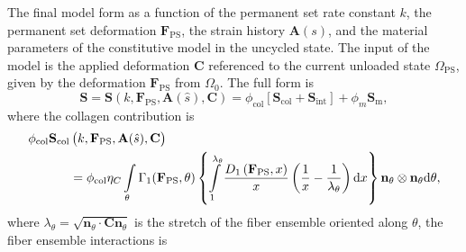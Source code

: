     The final model form as a function of the permanent set rate constant $k $, the permanent set deformation $\mathbf{F}_\mathrm{PS}$, the strain history $\mathbf{A}(s)$, and the material parameters of the constitutive model in the uncycled state. The input of the model is the applied deformation $\mathbf{C}$ referenced to the current unloaded state $\Omega_\mathrm{PS}$, given by the deformation $\mathbf{F}_\mathrm{PS}$ from $\Omega_0$. The full form is
\begin{equation}\label{c6:eq:fullEXLmodel}
\mathbf{S} = \mathbf{S}\left(k , \mathbf{F}_\mathrm{PS}, \mathbf{A}(\hat{s}), \mathbf{C}\right) = \phi_\mathrm{col} \left[ \mathbf{S}_\mathrm{col} + \mathbf{S}_\mathrm{int}\right] + \phi_m \mathbf{S}_\mathrm{m},
\end{equation}
where the collagen contribution is 
\begin{equation} \label{c6:eq:fullcollagen}
\begin{split}
\phi_\mathrm{col}\mathbf{S}_\mathrm{col}&\left(k , \mathbf{F}_\mathrm{PS}, \mathbf{A}(\hat{s}), \mathbf{C}\right) \\
&= \phi_\mathrm{col} \eta_C \int\displaylimits_\theta \Gamma_1(\mathbf{F}_{\mathrm{PS}}, \theta)\left\lbrace 
\int\displaylimits_1^{\lambda_\theta} \frac{D_1\left( \mathbf{F}_{\mathrm{PS}}, x \right)}{x} \left( \frac{1}{x}- \frac{1}{\lambda_\theta}\right) \mathrm{d}x \right\rbrace \mathbf{n}_\theta\otimes\mathbf{n}_\theta \mathrm{d}\theta,
\end{split}
\end{equation}
where $\lambda_\theta = \sqrt{\mathbf{n}_\theta \cdot \mathbf{C}\mathbf{n}_\theta}$ is the stretch of the fiber ensemble oriented along $\theta$, the fiber ensemble interactions is 
